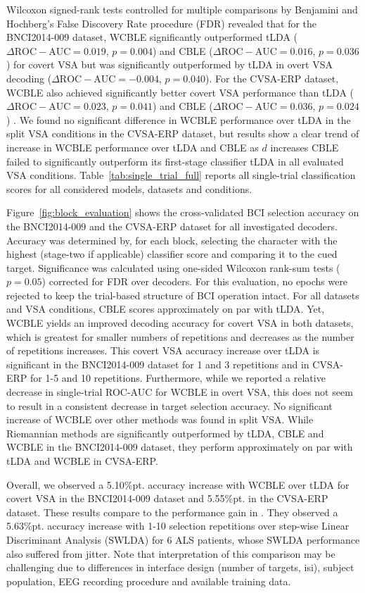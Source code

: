 Wilcoxon signed-rank tests controlled for multiple comparisons by Benjamini
and Hochberg's False Discovery Rate procedure (FDR) revealed that
for the BNCI2014-009 dataset, WCBLE significantly outperformed tLDA
($\Delta\mathrm{ROC-AUC} = 0.019$, $p=0.004$) and CBLE
($\Delta\mathrm{ROC-AUC} = 0.016$, $p=0.036$) for covert VSA
but was significantly outperformed by tLDA in overt VSA decoding
($\Delta\mathrm{ROC-AUC}=-0.004$, $p=0.040$).
For the CVSA-ERP dataset, WCBLE
also achieved significantly better covert VSA performance than tLDA ($\Delta\mathrm{ROC-AUC}
	= 0.023$, $p=0.041$) and CBLE ($\Delta\mathrm{ROC-AUC}
	= 0.036$, $p=0.024$) .
We found no significant difference in WCBLE performance over tLDA in the split
VSA conditions in the CVSA-ERP dataset, but results show a clear trend of
increase in WCBLE performance over tLDA and CBLE as $d$ increases
CBLE failed to significantly outperform its first-stage classifier tLDA in all
evaluated VSA conditions.
Table~\ref{tab:single_trial_full} reports all single-trial classification scores for all considered models, datasets
and conditions.

Figure~\ref{fig:block_evaluation} shows the cross-validated BCI selection
accuracy on the BNCI2014-009 and the CVSA-ERP dataset for all investigated
decoders.
Accuracy was determined by, for each block, selecting the character with the
highest (stage-two if applicable) classifier score and comparing it to the cued target.
Significance was calculated using one-sided Wilcoxon rank-sum tests ($p=0.05$)
corrected for FDR over decoders.
For this evaluation, no epochs were rejected to keep the trial-based structure of BCI
operation intact.
For all datasets and VSA conditions, CBLE scores approximately on par with tLDA.
Yet, WCBLE yields an improved decoding accuracy for covert VSA in both
datasets, which is greatest for smaller numbers of repetitions and
decreases as the number of repetitions increases.
This covert VSA accuracy increase over tLDA is significant in the BNCI2014-009 dataset
for 1 and 3 repetitions and in CVSA-ERP for 1-5 and 10 repetitions.
Furthermore, while we reported a relative decrease in single-trial ROC-AUC for
WCBLE in overt VSA, this does not seem to result in a consistent decrease in target
selection accuracy.
No significant increase of WCBLE over other methods was found in split VSA.
While Riemannian methods are significantly outperformed by tLDA, CBLE and WCBLE
in the BNCI2014-009 dataset, they perform approximately on par with tLDA and
WCBLE in CVSA-ERP.

Overall, we observed a 5.10\%pt. accuracy increase with WCBLE over
tLDA for covert VSA in the BNCI2014-009 dataset and 5.55\%pt. in the CVSA-ERP dataset.
These results compare to the performance gain in \cite{Zisk2022}.
They observed a 5.63\%pt. accuracy increase with 1-10 selection repetitions over
step-wise Linear Discriminant Analysis  (SWLDA) for 6 ALS patients, whose SWLDA
performance also suffered from jitter.
Note that interpretation of this comparison may be challenging due to differences in
interface design (number of targets, \ac{isi}), subject population,
EEG recording procedure and available training data.


